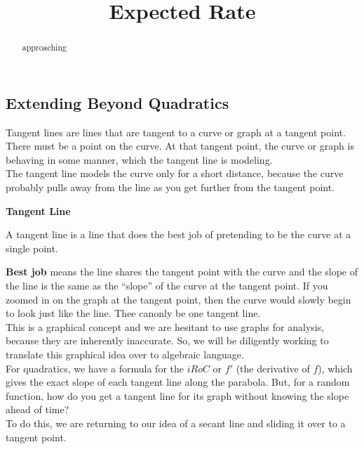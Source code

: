 \documentclass{ximera}
\title{Expected Rate}
\begin{document}
\begin{abstract}
approaching
\end{abstract}
\maketitle
 
 



\subsection*{Extending Beyond Quadratics} 


Tangent lines are lines that are tangent to a curve or graph at a tangent point. There must be a point on the curve. At that tangent point, the curve or graph is behaving in some manner, which the tangent line is modeling.  \\

The tangent line models the curve only for a short distance, because the curve probably pulls away from the line as you get further from the tangent point.\\

\begin{idea} \textbf{\textcolor{blue!55!black}{Tangent Line}}


A tangent line is a line that does the best job of pretending to be the curve at a single point.
\end{idea}


\textbf{Best job} means the line shares the tangent point with the curve and the slope of the line is the same as the ``slope'' of the curve at the tangent point. If you zoomed in on the graph at the tangent point, then the curve would slowly begin to look just like the line. Thee canonly be one tangent line.\\

This is a graphical concept and we are hesitant to use graphs for analysis, because they are inherently inaccurate. So, we will be diligently working to translate this graphical idea over to algebraic language. \\


For quadratics, we have a formula for the $iRoC$ or $f'$ (the derivative of $f$), which gives the exact slope of each tangent line along the parabola.  But, for a random function, how do you get a tangent line for its graph without knowing the slope ahead of time? \\


To do this, we are returning to our idea of a secant line and sliding it over to a tangent point. \\
\end{document}
